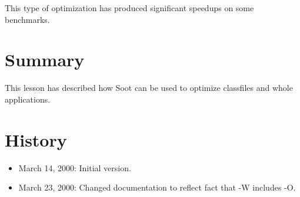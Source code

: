 \documentclass{article}
\begin{document}
This type of optimization has produced significant speedups on
some benchmarks.

\section{Summary}
This lesson has described how Soot can be used to optimize classfiles
and whole applications.

\section{History}
\begin{itemize}
\item March 14, 2000: Initial version.

\item March 23, 2000: Changed documentation to reflect fact that -W
includes -O.
\end{itemize}
\end{document}
